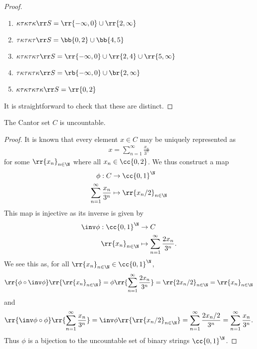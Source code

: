 \documentclass{article}
\begin{document}
\begin{claim*}[1]
\begin{proof}
\begin{enumerate}
      \item $\kappa\tau\kappa\tau\kappa\rr S=\rr{-\infty,0}\cup\rr{2,\infty}$
      \item $\tau\kappa\tau\kappa\tau\rr S=\bb{0,2}\cup\bb{4,5}$
      \item $\kappa\tau\kappa\tau\kappa\tau\rr S=\rr{-\infty,0}\cup\rr{2,4}\cup\rr{5,\infty}$
      \item $\tau\kappa\tau\kappa\tau\kappa\rr S=\rb{-\infty,0}\cup\br{2,\infty}$
      \item $\kappa\tau\kappa\tau\kappa\tau\kappa\rr S=\rr{0,2}$
    \end{enumerate}
    It is straightforward to check that these are distinct.
  \end{proof}
\end{claim*}

\begin{claim*}[2a]
  The Cantor set $C$ is uncountable.
  \begin{proof}
    It is known that every element $x\in C$ may be uniquely represented as
    \begin{align} \label{ternary}
      x = \sum_{n=1}^{ \infty } \frac{x_n}{3^n}
    \end{align}
    for some $\rr{x_n}_{n\in\N}$ where all $x_n\in\cc{0,2}$. We thus construct a map
    \begin{align*}
      \phi : C &\to \cc{0,1}^{\N}\\
      \sum_{n=1}^{ \infty } \frac{x_n}{3^n} &\mapsto \rr{x_n/2}_{n\in\N}
    \end{align*}
    This map is injective as its inverse is given by
    \begin{align*}
      \inv\phi : \cc{0,1}^\N &\to C \\
      \rr{x_n}_{n\in\N} &\mapsto \sum_{n=1}^{\infty} \frac{2x_n}{3^n}.
    \end{align*}
    We see this as, for all $\rr{x_n}_{n\in\N}\in \cc{0,1}^\N$,
    \begin{align*}
      \rr{\phi\circ\inv\phi}\rr{\rr{x_n}_{n\in\N}} = \phi\rr{\sum_{n=1}^{\infty} \frac{2x_n}{3^n}} = \rr{2x_n/2}_{n\in\N} = \rr{x_n}_{n\in\N}
    \end{align*}
    and
    \begin{align*}
      \rr{\inv\phi\circ\phi}\rr{\sum_{n=1}^{\infty} \frac{x_n}{3^n}} = \inv\phi\rr{\rr{x_n/2}_{n\in\N}} = \sum_{n=1}^{\infty} \frac{2x_n/2}{3^n} = \sum_{n=1}^{\infty} \frac{x_n}{3^n}.
    \end{align*}
    Thus $\phi$ is a bijection to the uncountable set of binary strings $\cc{0,1}^\N$.
  \end{proof}
\end{claim*}
\end{document}

